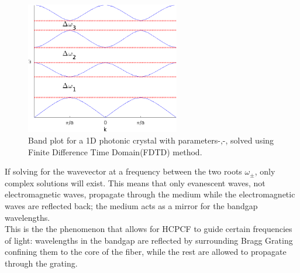 \begin{figure}[h]
	\centering
	\includegraphics[width=0.6\textwidth]{./Figures/HCPCF/1D_BandGap.png}
	\caption {Band plot for a 1D photonic crystal with parameters-,-, solved using Finite Difference Time Domain(FDTD) method\cite{sukhoivanov}.}
	\label{fig:1dbp}
\end{figure}

If solving for the wavevector at a frequency between the two roots $\omega_{\pm}$, only complex solutions will exist. This means that only evanescent waves, not electromagnetic waves, propagate through the medium while the electromagnetic waves are reflected back; the medium acts as a mirror for the bandgap wavelengths.\\
This is the the phenomenon that allows for HCPCF to guide certain frequencies of light: wavelengths in the bandgap are reflected by surrounding Bragg Grating confining them to the core of the fiber, while the rest are allowed to propagate through the grating.

